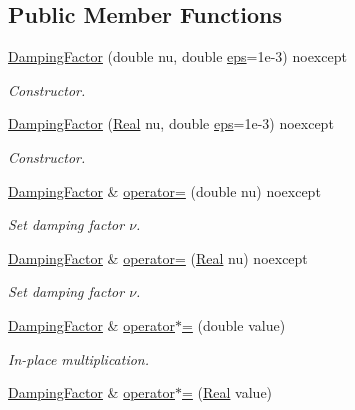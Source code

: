 \subsection*{Public Member Functions}
\begin{DoxyCompactItemize}
\item 
\hyperlink{classSpacy_1_1DampingFactor_a572e8b7dab2814f45b4f51045ebaaeb1}{Damping\+Factor} (double nu, double \hyperlink{classSpacy_1_1Mixin_1_1Eps_a40e2ba8f3abd2b5370ef41238cfaaf8b}{eps}=1e-\/3) noexcept
\begin{DoxyCompactList}\small\item\em Constructor. \end{DoxyCompactList}\item 
\hyperlink{classSpacy_1_1DampingFactor_a676874e5e00e91fa14fbe36c2048f326}{Damping\+Factor} (\hyperlink{classSpacy_1_1Real}{Real} nu, double \hyperlink{classSpacy_1_1Mixin_1_1Eps_a40e2ba8f3abd2b5370ef41238cfaaf8b}{eps}=1e-\/3) noexcept
\begin{DoxyCompactList}\small\item\em Constructor. \end{DoxyCompactList}\item 
\hyperlink{classSpacy_1_1DampingFactor}{Damping\+Factor} \& \hyperlink{classSpacy_1_1DampingFactor_a93d74a082141621147a8467d4efc2064}{operator=} (double nu) noexcept
\begin{DoxyCompactList}\small\item\em Set damping factor $\nu$. \end{DoxyCompactList}\item 
\hyperlink{classSpacy_1_1DampingFactor}{Damping\+Factor} \& \hyperlink{classSpacy_1_1DampingFactor_ae28aa1372882e7cc94ff64e16835e7bd}{operator=} (\hyperlink{classSpacy_1_1Real}{Real} nu) noexcept
\begin{DoxyCompactList}\small\item\em Set damping factor $\nu$. \end{DoxyCompactList}\item 
\hyperlink{classSpacy_1_1DampingFactor}{Damping\+Factor} \& \hyperlink{classSpacy_1_1DampingFactor_a9a443b4d95c537acba907fddaaad01bb}{operator$\ast$=} (double value)\hypertarget{classSpacy_1_1DampingFactor_a9a443b4d95c537acba907fddaaad01bb}{}\label{classSpacy_1_1DampingFactor_a9a443b4d95c537acba907fddaaad01bb}

\begin{DoxyCompactList}\small\item\em In-\/place multiplication. \end{DoxyCompactList}\item 
\hyperlink{classSpacy_1_1DampingFactor}{Damping\+Factor} \& \hyperlink{classSpacy_1_1DampingFactor_a58e54413ae9d5a78e90a7f99c58a127a}{operator$\ast$=} (\hyperlink{classSpacy_1_1Real}{Real} value)\hypertarget{classSpacy_1_1DampingFactor_a58e54413ae9d5a78e90a7f99c58a127a}{}\label{classSpacy_1_1DampingFactor_a58e54413ae9d5a78e90a7f99c58a127a}


\end{DoxyCompactItemize}
